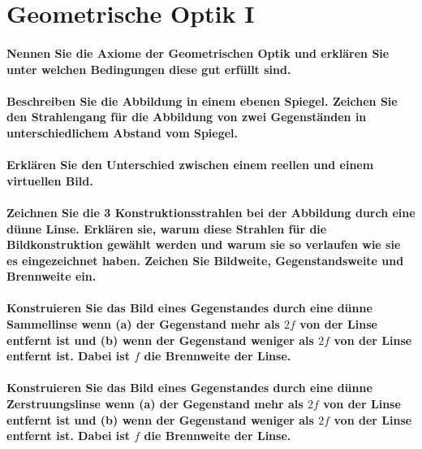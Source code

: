 \documentclass[a4paper, 11pt, parskip=half]{scrartcl}
\begin{document}
\newpage

\section{Geometrische Optik I}

\paragraph{Nennen Sie die Axiome der Geometrischen Optik und erklären Sie unter welchen Bedingungen
diese gut erfüllt sind.}

\paragraph{Beschreiben Sie die Abbildung in einem ebenen Spiegel. Zeichen Sie den Strahlengang für
die Abbildung von zwei Gegenständen in unterschiedlichem Abstand vom Spiegel.}

\paragraph{Erklären Sie den Unterschied zwischen einem reellen und einem virtuellen Bild.}

\paragraph{Zeichnen Sie die 3 Konstruktionsstrahlen bei der Abbildung durch eine dünne Linse.
Erklären sie, warum diese Strahlen für die Bildkonstruktion gewählt werden und warum sie so
verlaufen wie sie es eingezeichnet haben. Zeichen Sie Bildweite, Gegenstandsweite und Brennweite
ein.}

\paragraph{Konstruieren Sie das Bild eines Gegenstandes durch eine dünne Sammellinse wenn (a) der
Gegenstand mehr als $2f$ von der Linse entfernt ist und (b) wenn der Gegenstand weniger als $2f$ von
der Linse entfernt ist. Dabei ist $f$ die Brennweite der Linse.}

\paragraph{Konstruieren Sie das Bild eines Gegenstandes durch eine dünne Zerstruungslinse wenn (a)
der Gegenstand mehr als $2f$ von der Linse entfernt ist und (b) wenn der Gegenstand weniger
als $2f$ von der Linse entfernt ist. Dabei ist $f$ die Brennweite der Linse.}
\end{document}
